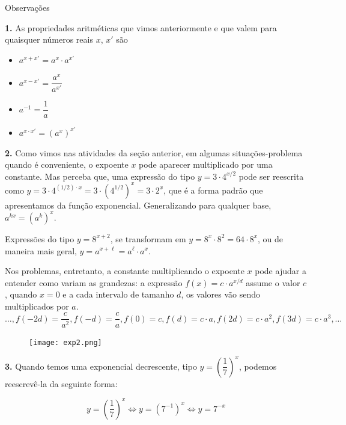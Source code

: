 \begin{observation}{Observações}

 \textbf{1.} As propriedades aritméticas que vimos anteriormente e que valem para quaisquer números reais $x$, $x'$ são

\begin{itemize}

\item{} $a^{x+x'} = a^{x}  \cdot a^{x'}$

\item{} $a^{x-x'}  = \dfrac{a^{x}}{a^{x'}}$

\item{} $a^{-1} = \dfrac{1}{a}$

\item{} $a^{x \cdot x'} = (a^{x})^{x'}$

\end{itemize}

 \textbf{2.} Como vimos nas atividades da seção anterior, em algumas situações-problema quando é conveniente, o expoente $x$ pode aparecer multiplicado por uma constante. Mas perceba que, uma expressão do tipo $y=3 \cdot 4^{x/2}$ pode ser reescrita como $y=3\cdot 4^{(1/2)\cdot x}=3 \cdot (4^{1/2})^{x} = 3 \cdot 2^{x}$, que é a forma padrão que apresentamos da função exponencial. Generalizando para qualquer base, $a^{kx} = (a^{k})^{x}$.

Expressões do tipo $ y=8^{x+2} $, se transformam em $ y=8^x \cdot 8^2 = 64\cdot 8^x$, ou de maneira mais geral, $ y=a^{x+\ell}=a^\ell \cdot a^x $.

Nos problemas, entretanto, a constante multiplicando o expoente $x$ pode ajudar a entender como variam as grandezas: a expressão $f(x)=c \cdot a^{x/d}$ assume o valor $c$, quando $x=0$ e a cada intervalo de tamanho $d$, os valores vão sendo multiplicados por $a$.
\[
\ldots, f(-2d)=\dfrac c{a^2}, f(-d)=\dfrac ca, f(0)=c, f(d)=c\cdot a, f(2d)=c\cdot a^2, f(3d)=c\cdot a^{3}, \ldots
\]

\begin{figure}[H]
\centering
\texttt{[image: exp2.png]}
\end{figure}

 \textbf{3.} Quando temos uma exponencial decrescente, tipo $y=\left( \dfrac{1}{7} \right)^{x}$, podemos reescrevê-la da seguinte forma:

\[
y=\left( \dfrac{1}{7} \right)^{x} \iff y=( 7^{-1})^{x} \iff y=7^{-x}
\]

\end{observation}



